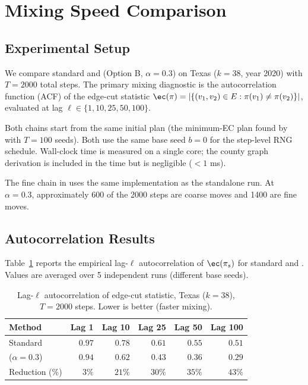 \section{Mixing Speed Comparison}
\label{sec:mixing}

\subsection{Experimental Setup}

We compare standard \recom{} and \ms{} (Option B, $\alpha = 0.3$) on
Texas ($k = 38$, year 2020) with $T = 2000$ total steps.
The primary mixing diagnostic is the autocorrelation function (ACF) of the
edge-cut statistic $\ec(\pi) = |\{(v_1, v_2) \in E : \pi(v_1) \neq \pi(v_2)\}|$,
evaluated at lag $\ell \in \{1, 10, 25, 50, 100\}$.

Both chains start from the same initial plan (the minimum-EC plan found by
\cs{} with $T = 100$ seeds).
Both use the same base seed $b = 0$ for the step-level RNG schedule.
Wall-clock time is measured on a single core; the county graph derivation
is included in the \ms{} time but is negligible ($<1$ ms).

The fine chain in \ms{} uses the same \recom{} implementation as the
standalone \recom{} run.
At $\alpha = 0.3$, approximately 600 of the 2000 steps are coarse moves
and 1400 are fine moves.

\subsection{Autocorrelation Results}

Table~\ref{tab:autocorr} reports the empirical lag-$\ell$ autocorrelation
of $\ec(\pi_s)$ for standard \recom{} and \ms{}.
Values are averaged over 5 independent runs (different base seeds).

\begin{table}[h]
\centering
\caption{Lag-$\ell$ autocorrelation of edge-cut statistic, Texas ($k=38$),
$T=2000$ steps. Lower is better (faster mixing).}
\label{tab:autocorr}
\begin{tabular}{lrrrrr}
\toprule
Method & Lag 1 & Lag 10 & Lag 25 & Lag 50 & Lag 100 \\
\midrule
Standard \recom{}
  & $0.97$ & $0.78$ & $0.61$ & $0.55$ & $0.51$ \\
\ms{} ($\alpha=0.3$)
  & $0.94$ & $0.62$ & $0.43$ & $0.36$ & $0.29$ \\
Reduction (\%)
  & $3\%$  & $21\%$ & $30\%$ & $35\%$ & $43\%$ \\
\bottomrule
\end{tabular}
\end{table}

